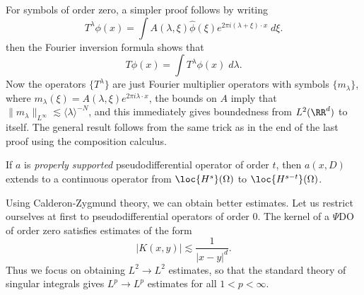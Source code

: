 \begin{remark}
    For symbols of order zero, a simpler proof follows by writing
    \[ T^\lambda \phi(x) = \int A(\lambda, \xi) \widehat{\phi}(\xi) e^{2 \pi i (\lambda + \xi) \cdot x}\; d\xi. \]
    then the Fourier inversion formula shows that
    \[ T \phi(x) = \int T^\lambda \phi(x)\; d\lambda. \]
    Now the operators $\{ T^\lambda \}$ are just Fourier multiplier operators with symbols $\{ m_\lambda \}$, where $m_\lambda(\xi) = A(\lambda, \xi) e^{2 \pi i \lambda \cdot x}$, the bounds on $A$ imply that $\| m_\lambda \|_{L^\infty} \lesssim \langle \lambda \rangle^{-N}$, and this immediately gives boundedness from $L^2(\RR^d)$ to itself. The general result follows from the same trick as in the end of the last proof using the composition calculus.
\end{remark}

\begin{remark}
    If $a$ is \emph{properly supported} pseudodifferential operator of order $t$, then $a(x,D)$ extends to a continuous operator from $\loc{H^s}(\Omega)$ to $\loc{H^{s-t}}(\Omega)$.
\end{remark}

Using Calderon-Zygmund theory, we can obtain better estimates. Let us restrict ourselves at first to pseudodifferential operators of order $0$. The kernel of a $\Psi$DO of order zero satisfies estimates of the form
%
\[ |K(x,y)| \lesssim \frac{1}{|x - y|^d}. \]
%
Thus we focus on obtaining $L^2 \to L^2$ estimates, so that the standard theory of singular integrals gives $L^p \to L^p$ estimates for all $1 < p < \infty$.

